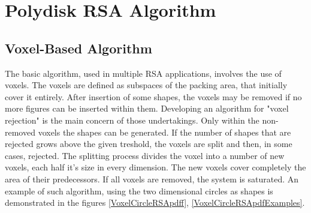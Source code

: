 \documentclass[12pt, oneside]{report}
\begin{document}

\chapter{Polydisk RSA Algorithm}

\section {Voxel-Based Algorithm}

The basic algorithm, used in multiple RSA applications, involves the use of voxels. The voxels are defined as subspaces of the packing area, that initially cover it entirely. After insertion of some shapes, the voxels may be removed if no more figures can be inserted within them. Developing an algorithm for "voxel rejection" is the main concern of those undertakings. Only within the non-removed voxels the shapes can be generated. If the number of shapes that are rejected grows above the given treshold, the voxels are split and then, in some cases, rejected. The splitting process divides the voxel into a number of new voxels, each half it's size in every dimension. The new voxels cover completely the area of their predecessors. If all voxels are removed, the system is saturated. An example of such algorithm, using the two dimensional circles as shapes is demonstrated in the figures \ref{VoxelCircleRSApdff}, \ref{VoxelCircleRSApdfExamples}.
\end{document}

